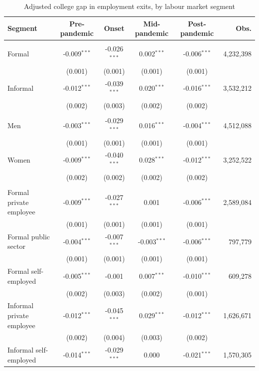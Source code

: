 \begin{table}[H]
\centering
\caption{Adjusted college gap in employment exits, by labour market segment}
\label{tab:heterogeneity}
\begin{threeparttable}
\small
\setlength{\tabcolsep}{4pt}
\begin{tabular}{lccccr}
\toprule
Segment & Pre-pandemic & Onset & Mid-pandemic & Post-pandemic & Obs. \\
\midrule
\addlinespace\multicolumn{6}{l}{\textit{Formality}} \\
\quad Formal & -0.009$^{***}$ & -0.026$^{***}$ & 0.002$^{***}$ & -0.006$^{***}$ & 4,232,398 \\
 & (0.001) & (0.001) & (0.001) & (0.001) & \\
\quad Informal & -0.012$^{***}$ & -0.039$^{***}$ & 0.020$^{***}$ & -0.016$^{***}$ & 3,532,212 \\
 & (0.002) & (0.003) & (0.002) & (0.002) & \\
\addlinespace\multicolumn{6}{l}{\textit{Gender}} \\
\quad Men & -0.003$^{***}$ & -0.029$^{***}$ & 0.016$^{***}$ & -0.004$^{***}$ & 4,512,088 \\
 & (0.001) & (0.001) & (0.001) & (0.001) & \\
\quad Women & -0.009$^{***}$ & -0.040$^{***}$ & 0.028$^{***}$ & -0.012$^{***}$ & 3,252,522 \\
 & (0.002) & (0.002) & (0.002) & (0.002) & \\
\addlinespace\multicolumn{6}{l}{\textit{Position}} \\
\quad Formal private employee & -0.009$^{***}$ & -0.027$^{***}$ & 0.001 & -0.006$^{***}$ & 2,589,084 \\
 & (0.001) & (0.001) & (0.001) & (0.001) & \\
\quad Formal public sector & -0.004$^{***}$ & -0.007$^{***}$ & -0.003$^{***}$ & -0.006$^{***}$ & 797,779 \\
 & (0.001) & (0.001) & (0.001) & (0.001) & \\
\quad Formal self-employed & -0.005$^{***}$ & -0.001 & 0.007$^{***}$ & -0.010$^{***}$ & 609,278 \\
 & (0.002) & (0.003) & (0.002) & (0.001) & \\
\quad Informal private employee & -0.012$^{***}$ & -0.045$^{***}$ & 0.029$^{***}$ & -0.012$^{***}$ & 1,626,671 \\
 & (0.002) & (0.004) & (0.003) & (0.002) & \\
\quad Informal self-employed & -0.014$^{***}$ & -0.029$^{***}$ & 0.000 & -0.021$^{***}$ & 1,570,305 \\

\end{tabular}
\end{threeparttable}
\end{table}
